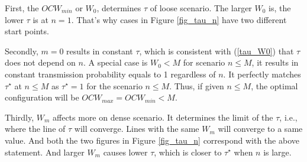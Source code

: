 \documentclass[journal]{IEEEtran}
\begin{document}
First, the $OCW_{min}$ or $W_0$, determines $\tau$ of loose scenario. 
The larger $W_0$ is, the lower $\tau$ is at $n=1$.
That's why cases in Figure \ref{fig_tau_n} have two different start points.

Secondly, $m=0$ results in constant $\tau$, which is consistent with (\ref{tau_W0}) that $\tau$ does not depend on $n$.
A special case is $W_0<M$ for scenario $n\leq M$, it results in constant transmission probability equals to 1 regardless of $n$. 
It perfectly matches $\tau^\star$ at $n\leq M$ as $\tau^\star = 1$ for the scenario $n \leq M$.
Thus, if given $n\leq M$, the optimal configuration will be $OCW_{max}= OCW_{min} < M$. 


Thirdly, $W_m$ affects more on dense scenario.
It determines the limit of the $\tau$, i.e., where the line of $\tau$ will converge. 
Lines with the same $W_m$ will converge to a same value. 
And both the two figures in Figure \ref{fig_tau_n} correspond with the above statement.
And larger $W_m$ causes lower $\tau$, which is closer to $\tau^\star$ when $n$ is large. 
 
\end{document}
